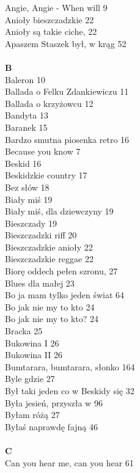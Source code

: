 \documentclass[a5paper, 10pt]{book}
\begin{document}
{\begin{multicols}{3}
    Angie, Angie - When will 9\\
    Anioły bieszczadzkie 22\\
    Anioły są takie ciche, 22\\
    Apaszem Staszek był, w krąg 52\\
    \\
    {\footnotesize \textbf{B\\} }
    Baleron 10\\
    Ballada o Felku Zdankiewiczu 11\\
    Ballada o krzyżowcu 12\\
    Bandyta 13\\
    Baranek 15\\
    Bardzo smutna piosenka retro 16\\
    Because you know 7\\
    Beskid 16\\
    Beskidzkie country 17\\
    Bez słów 18\\
    Biały miś 19\\
    Biały miś, dla dziewczyny 19\\
    Bieszczady 19\\
    Bieszczadzki riff 20\\
    Bieszczadzkie anioły 22\\
    Bieszczadzkie reggae 22\\
    Biorę oddech pełen szronu, 27\\
    Blues dla małej 23\\
    Bo ja mam tylko jeden świat 64\\
    Bo jak nie my to kto 24\\
    Bo jak nie my to kto? 24\\
    Bracka 25\\
    Bukowina I 26\\
    Bukowina II 26\\
    Bumtarara, bumtarara, słonko 164\\
    Byle gdzie 27\\
    Był taki jeden co w Beskidy się 32\\
    Była jesień, przyszła w 96\\
    Byłam różą 27\\
    Byłaś naprawdę fajną 46\\
    \\
    {\footnotesize \textbf{C\\} }
    Can you hear me, can you hear 61\\

\end{multicols}}
\end{document}
